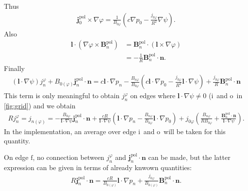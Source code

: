 \documentclass[a4paper, 10pt, english]{article}
\let\temp\varrho
\let\varrho\rho
\let\rho\temp
\let\temp\vartheta
\let\vartheta\theta
\let\theta\temp
\let\temp\varphi
\let\varphi\phi
\let\phi\temp
\let\vec\symbf
\newcommand*\pol{\ensuremath{\textrm{pol}}}  %
\newcommand*\fs{\ensuremath{\textrm{f}}}  %
\newcommand*\inw{\ensuremath{\textrm{i}}}  %
\newcommand*\out{\ensuremath{\textrm{o}}}  %
\begin{document}
Thus
\begin{gather}
  \vec{j}_{0}^{\pol} \times \nabla \phi = \frac{1}{B_{0 \phi}} \left( c \nabla p_{0} - \frac{j_{0 \phi}}{R^{2}} \nabla \psi \right).
\end{gather}
Also
\begin{align}
  \vec{l} \cdot (\nabla \phi \times \vec{B}_{n}^{\pol}) &= \vec{B}_{n}^{\pol} \cdot (\vec{l} \times \nabla \phi) \nonumber \\
  &= -\frac{1}{R} \vec{B}_{n}^{\pol} \cdot \vec{n}.
\end{align}
Finally
\begin{gather}
  (\vec{l} \cdot \nabla \psi) j_{n}^{\phi} + B_{0 (\phi)} \vec{j}_{n}^{\pol} \cdot \vec{n} = c \vec{l} \cdot \nabla p_{n} - \frac{B_{n \phi}}{B_{0 \phi}} \left( c \vec{l} \cdot \nabla p_{0} - \frac{j_{0 \phi}}{R^{2}} \vec{l} \cdot \nabla \psi \right) + \frac{j_{0 \phi}}{R} \vec{B}_{n}^{\pol} \cdot \vec{n} \label{eq:jnphi-jnpol}
\end{gather}
This term is only meaningful to obtain $j_{n}^{\phi}$ on edges where $\vec{l} \cdot \nabla \psi \neq 0$ (\inw\ and \out\ in \cref{fig:grid}) and we obtain
\begin{gather}
  R j_{n}^{\phi} = j_{n (\phi)} = -\frac{B_{0 \phi}}{\vec{l} \cdot \nabla \psi} \vec{j}_{n}^{\pol} \cdot \vec{n} + \frac{c R}{\vec{l} \cdot \nabla \psi} \left( \vec{l} \cdot \nabla p_{n} - \frac{B_{n \phi}}{B_{0 \phi}} \vec{l} \cdot \nabla p_{0} \right) + j_{0 \phi} \left( \frac{B_{n \phi}}{R B_{0 \phi}} + \frac{\vec{B}_{n}^{\pol} \cdot \vec{n}}{\vec{l} \cdot \nabla \psi} \right). \label{eq:jnphi}
\end{gather}
In the implementation, an average over edge \inw\ and \out\ will be taken for this quantity.

On edge \fs, no connection between $j_{n}^{\phi}$ and $\vec{j}_{n}^{\pol} \cdot \vec{n}$ can be made, but the latter expression can be given in terms of already knwown quantities:
\begin{gather}
  R \vec{j}_{n}^{\pol} \cdot \vec{n} = \frac{c R}{B_{0 (\phi)}} \vec{l} \cdot \nabla p_{n} + \frac{j_{0 \phi}}{B_{0 (\phi)}} \vec{B}_{n}^{\pol} \cdot \vec{n}. \label{eq:If}
\end{gather}
\end{document}
